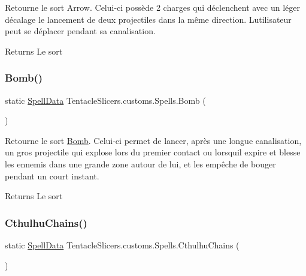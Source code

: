 Retourne le sort Arrow. Celui-\/ci possède 2 charges qui déclenchent avec un léger décalage le lancement de deux projectiles dans la même direction. L\textquotesingle{}utilisateur peut se déplacer pendant sa canalisation. 

\begin{DoxyReturn}{Returns}
Le sort 
\end{DoxyReturn}
\mbox{\label{class_tentacle_slicers_1_1customs_1_1_spells_a4fe8191cc9ebf12f1519d23d58e711ab}} 
\subsubsection{\texorpdfstring{Bomb()}{Bomb()}}
{\footnotesize\ttfamily static \hyperlink{class_tentacle_slicers_1_1spells_1_1_spell_data}{Spell\+Data} Tentacle\+Slicers.\+customs.\+Spells.\+Bomb (\begin{DoxyParamCaption}{ }\end{DoxyParamCaption})\hspace{0.3cm}{\ttfamily [static]}}



Retourne le sort \hyperlink{class_tentacle_slicers_1_1customs_1_1_bomb}{Bomb}. Celui-\/ci permet de lancer, après une longue canalisation, un gros projectile qui explose lors du premier contact ou lorsqu\textquotesingle{}il expire et blesse les ennemis dans une grande zone autour de lui, et les empêche de bouger pendant un court instant. 

\begin{DoxyReturn}{Returns}
Le sort 
\end{DoxyReturn}
\mbox{\label{class_tentacle_slicers_1_1customs_1_1_spells_aa4f86ba1ed765465f478d1bad8021f92}} 
\subsubsection{\texorpdfstring{Cthulhu\+Chains()}{CthulhuChains()}}
{\footnotesize\ttfamily static \hyperlink{class_tentacle_slicers_1_1spells_1_1_spell_data}{Spell\+Data} Tentacle\+Slicers.\+customs.\+Spells.\+Cthulhu\+Chains (\begin{DoxyParamCaption}{ }\end{DoxyParamCaption})\hspace{0.3cm}{\ttfamily [static]}}



